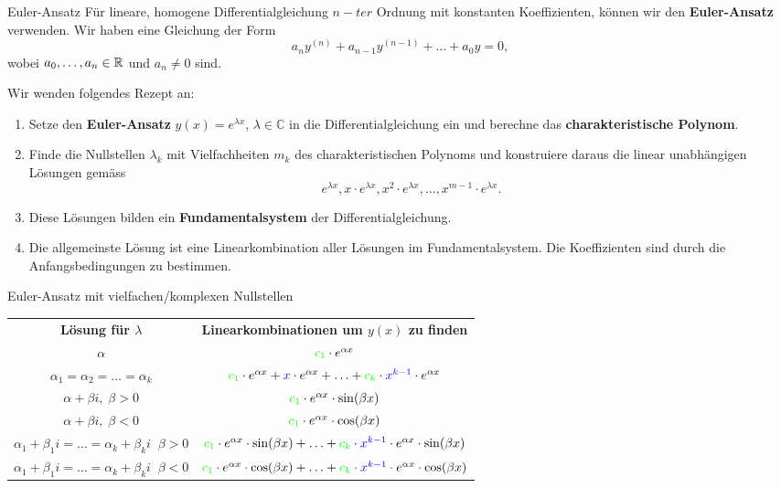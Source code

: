 \begin{Rezept}{Euler-Ansatz}{}
	Für lineare, homogene Differentialgleichung $n-ter$ Ordnung mit konstanten Koeffizienten, können wir den \textbf{Euler-Ansatz} verwenden. Wir haben eine Gleichung der Form
	\begin{equation*}
	a_n y^{(n)} + a_{n-1} y^{(n-1)} + \dots + a_0 y = 0,
	\end{equation*}
	wobei $a_0,\dots, a_n \in \mathbb{R}$ und $a_n\neq 0$ sind.
	
	Wir wenden folgendes Rezept an:
	\begin{enumerate}
		\item Setze den \textbf{Euler-Ansatz} $y(x) = e^{\lambda x}$, $\lambda \in\mathbb{C}$ in die Differentialgleichung ein und berechne das \textbf{charakteristische Polynom}.
		\item Finde die Nullstellen $\lambda_k$ mit Vielfachheiten $m_k$ des charakteristischen Polynoms und konstruiere daraus die linear unabhängigen Lösungen gemäss
		\begin{equation*}
		e^{\lambda x}, x \cdot e^{\lambda x}, x^2 \cdot e^{\lambda x}, \dots, x^{m-1} \cdot e^{\lambda x}.
		\end{equation*}
		\item Diese Lösungen bilden ein \textbf{Fundamentalsystem} der Differentialgleichung.
		\item Die allgemeinste Lösung ist eine Linearkombination aller Lösungen im Fundamentalsystem. Die Koeffizienten sind durch die Anfangsbedingungen zu bestimmen.
	\end{enumerate}
\end{Rezept}

\begin{Rezept}{Euler-Ansatz mit vielfachen/komplexen Nullstellen}{}
    \begin{tabular}{c|c}
         \textbf{Lösung für $\lambda$} & \textbf{Linearkombinationen um $y(x)$ zu finden}\\
         $\alpha$ & ${\color{green}c_1} \cdot e^{\alpha x}$\\
         $\alpha_1 = \alpha_2 = \ldots = \alpha_k$ & ${\color{green}c_1} \cdot e^{\alpha x} + {\color{blue} x} \cdot e^{\alpha x} + \ldots + {\color{green}c_k} \cdot {\color{blue} x^{k-1}} \cdot e^{\alpha x}$\\
         $\alpha + \beta i, \; \beta>0$ & ${\color{green}c_1} \cdot e^{\alpha x} \cdot \sin(\beta x)$\\
         $\alpha + \beta i, \; \beta<0$ & ${\color{green}c_1} \cdot e^{\alpha x} \cdot \cos(\beta x)$\\
         $\alpha_1 + \beta_1 i = \ldots = \alpha_k + \beta_k i \;\; \beta>0$ & ${\color{green}c_1} \cdot e^{\alpha x} \cdot \sin(\beta x) + \ldots + {\color{green}c_k} \cdot {\color{blue} x^{k-1}} \cdot e^{\alpha x} \cdot \sin(\beta x)$\\
         $\alpha_1 + \beta_1 i = \ldots = \alpha_k + \beta_k i \;\; \beta<0$ & ${\color{green}c_1} \cdot e^{\alpha x} \cdot \cos(\beta x) + \ldots + {\color{green}c_k} \cdot {\color{blue} x^{k-1}} \cdot e^{\alpha x} \cdot \cos(\beta x)$\\
    \end{tabular}
\end{Rezept}

